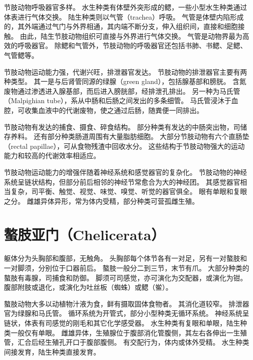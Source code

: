 \documentclass[11pt]{article}
\begin{document}
\newline

节肢动物呼吸器官多样。
水生种类有体壁外突形成的鳃，一些小型水生种类通过体表进行气体交换。
陆生种类则以气管（trachea）呼吸。
气管是体壁内陷形成的，其外端通过气门与外界相通，其内端不断分支，伸入组织间，直接和细胞接触。
由此，陆生节肢动物组织可直接与外界进行气体交换。
气管是动物界最为高效的呼吸器官。
除鳃和气管外，节肢动物的呼吸器官还包括书肺、书鳃、足鳃、气管鳃等。

\newline

节肢动物运动能力强，代谢兴旺，排泄器官发达。
节肢动物的排泄器官主要有两种类型。
其一是与后肾管同源的绿腺（green gland），包括腺基部和膀胱。
含氮废物通过渗透进入腺基部，而后进入膀胱部，经排泄孔排出。
另一种为马氏管（Malpighian tube），系从中肠和后肠之间发出的多条细管。
马氏管浸沐于血腔，可收集血液中的代谢废物，使之通过后肠，随粪便一同排出。

\newline

节肢动物有发达的捕食、摄食、碎食结构。
部分种类有发达的中肠突出物，司储存养料。
还有部分种类肠道周围有大量脂肪细胞。
大部分节肢动物有六个直肠垫（rectal papillae），可从食物残渣中回收水分。
这些结构于节肢动物强大的运动能力和较高的代谢效率相适应。

\newline

节肢动物运动能力的增强伴随着神经系统和感觉器官的复杂化。
节肢动物的神经系统呈链状结构，但部分前后相邻的神经节常愈合为大的神经团。
其感觉器官相当复杂，司平衡、触觉、视觉、味觉、嗅觉、听觉的器官俱全。
眼有单眼和复眼之分。
雌雄异体异形，常为体内受精，部分种类可营孤雌生殖。

\section{螯肢亚门（Chelicerata）}
躯体分为头胸部和腹部，无触角。
头胸部每个体节各有一对足，另有一对螯肢和一对脚须，分别位于口器前后。
螯肢一般分二到三节，末节有爪。
大部分种类的螯肢有毒腺，司捕食和防御。
脚须可司感觉，亦可演化为交配器，或演化为钳。
腹部附肢或退化，或演化为吐丝板（蜘蛛）或鳃（鲎）。

\newline

螯肢动物大多以动植物汁液为食，鲜有摄取固体食物者。
其消化道较窄。
排泄器官为绿腺和马氏管。
循环系统为开管式，部分小型种类无循环系统。
神经系统呈链状，体表有司感觉的刚毛和其它化学感受器。
水生种类有复眼和单眼，陆生种类一般仅有单眼。
雌雄异体，生殖腺位于腹部消化管腹侧，其左右各伸出一生殖管，汇合后经生殖孔开口于腹部腹侧。
有交配行为，体内或体外受精。
水生种类间接发育，陆生种类直接发育。
\end{document}
